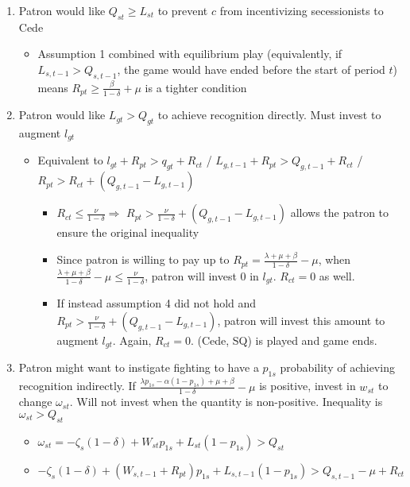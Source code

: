 \documentclass[12pt]{article}
\newcommand{\de}{\delta}
\begin{document}
\begin{enumerate}
	\item Patron would like $Q_{st} \geq L_{st}$ to prevent $c$ from incentivizing secessionists to Cede
		
				\begin{itemize}
					\item Assumption 1 combined with equilibrium play (equivalently, if $L_{s,t-1} > Q_{s,t-1}$, the game would have ended before the start of period $t$) means $R_{pt} \geq \frac{\beta}{1-\de} + \mu$ is a tighter condition
				\end{itemize}
		
		
	\item Patron would like $L_{gt} > Q_{gt}$ to achieve recognition directly. Must invest to augment $l_{gt}$
		\begin{itemize}
			\item Equivalent to $l_{gt} + R_{pt} > q_{gt} + R_{ct}$ / $L_{g,t-1} + R_{pt} > Q_{g,t-1} + R_{ct}$ / $R_{pt} > R_{ct} + \left( Q_{g,t-1} - L_{g,t-1}\right)$
				\begin{itemize}
					\item $R_{ct} \leq \frac{\nu}{1-\de} \Rightarrow$ $R_{pt} > \frac{\nu}{1-\de} + \left( Q_{g,t-1} - L_{g,t-1}\right)$ allows the patron to ensure the original inequality
					\item Since patron is willing to pay up to $R_{pt} = \frac{\lambda +\mu + \beta}{1-\de} - \mu$, when $\frac{\lambda +\mu + \beta}{1-\de} -\mu \leq \frac{\nu}{1-\de}$, patron will invest 0 in $l_{gt}$. $R_{ct} = 0$ as well.
					\item If instead assumption 4 did not hold and $R_{pt} > \frac{\nu}{1-\de} + \left( Q_{g,t-1} - L_{g,t-1}\right)$, patron will invest this amount to augment $l_{gt}$. Again, $R_{ct} = 0$. (Cede, SQ) is played and game ends.
				\end{itemize}
		\end{itemize}
	\item Patron might want to instigate fighting to have a $p_{1s}$ probability of achieving recognition indirectly. If $\frac{\lambda p_{1s} - \alpha (1-p_{1s}) + \mu + \beta}{1 - \de} -\mu$ is positive, invest in $w_{st}$ to change $\omega_{st}$. Will not invest when the quantity is non-positive. Inequality is $\omega_{st} > Q_{st}$
		\begin{itemize}
			\item $\omega_{st} = -\zeta_{s}(1-\de) + W_{st}p_{1s} + L_{st}(1-p_{1s}) > Q_{st}$
			\item $-\zeta_{s}(1-\de) + (W_{s,t-1}+R_{pt})p_{1s} + L_{s,t-1}(1-p_{1s}) > Q_{s,t-1} - \mu + R_{ct}$

\end{itemize}
\end{enumerate}
\end{document}

